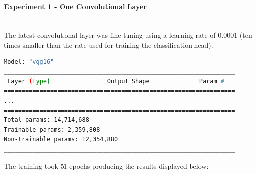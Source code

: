 \documentclass[11pt,a4paper]{article}
\begin{document}
\paragraph{Experiment 1 - One Convolutional Layer}\mbox{}\\
The latest convolutional layer was fine tuning using a learning rate of $0.0001$ (ten times smaller than the rate used for training the classification head).
\begin{lstlisting}[language=bash,frame=single]
Model: "vgg16"
_________________________________________________________________
 Layer (type)                Output Shape              Param #   
=================================================================
...
=================================================================
Total params: 14,714,688
Trainable params: 2,359,808
Non-trainable params: 12,354,880
_________________________________________________________________
\end{lstlisting}
The training took $51$ epochs producing the results displayed below:
\end{document}
